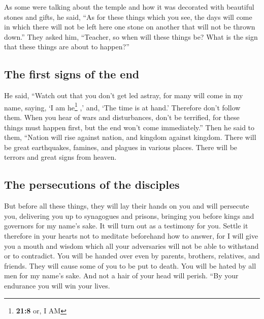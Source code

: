  As some were talking about the temple and how it was
decorated with beautiful stones and gifts, he said,  ``As
for these things which you see, the days will come in which there will
not be left here one stone on another that will not be thrown down.''
 They asked him, ``Teacher, so when will these things be?
What is the sign that these things are about to happen?''

\hypertarget{the-first-signs-of-the-end}{%
\subsection{The first signs of the
end}\label{the-first-signs-of-the-end}}

 He said, ``Watch out that you don't get led astray, for
many will come in my name, saying, `I am he\footnote{\textbf{21:8} or, I
  AM} ,' and, `The time is at hand.' Therefore don't follow them.
 When you hear of wars and disturbances, don't be
terrified, for these things must happen first, but the end won't come
immediately.''  Then he said to them, ``Nation will rise
against nation, and kingdom against kingdom.  There will
be great earthquakes, famines, and plagues in various places. There will
be terrors and great signs from heaven.

\hypertarget{the-persecutions-of-the-disciples}{%
\subsection{The persecutions of the
disciples}\label{the-persecutions-of-the-disciples}}

 But before all these things, they will lay their hands
on you and will persecute you, delivering you up to synagogues and
prisons, bringing you before kings and governors for my name's sake.
 It will turn out as a testimony for you. 
Settle it therefore in your hearts not to meditate beforehand how to
answer,  for I will give you a mouth and wisdom which all
your adversaries will not be able to withstand or to contradict.
 You will be handed over even by parents, brothers,
relatives, and friends. They will cause some of you to be put to death.
 You will be hated by all men for my name's sake.
 And not a hair of your head will perish. 
``By your endurance you will win your lives.

